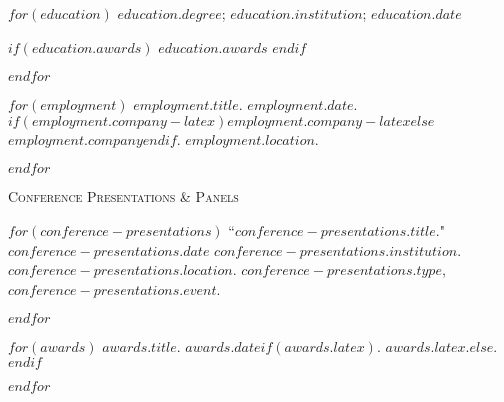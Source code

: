 \documentclass[11pt,article,oneside]{memoir}
\begin{document}
\medskip

\reversemarginpar

\bigskip

%
%

\medskip
{}

$for(education)$
\ind $education.degree$; $education.institution$; $education.date$

$if(education.awards)$
\ind \hspace{0.35in} \footnotesize $education.awards$ \normalsize \vspace{0.05in}
$endif$

$endfor$

\bigskip

\medskip
{}

$for(employment)$
\ind $employment.title$. \emph{$employment.date$}. $if(employment.company-latex)$$employment.company-latex$$else$$employment.company$$endif$. $employment.location$.

\smallskip
$endfor$

\medskip

\medskip
{}

\ind \textsc{Conference Presentations \& Panels}

\medskip

$for(conference-presentations)$
\ind ``$conference-presentations.title$." \emph{$conference-presentations.date$} $conference-presentations.institution$. $conference-presentations.location$. $conference-presentations.type$, \emph{$conference-presentations.event$}. \normalsize

\smallskip

\pagebreak[1]
$endfor$

\medskip

\medskip
{}

$for(awards)$
\ind $awards.title$. \emph{$awards.date$}$if(awards.latex)$. $awards.latex$.$else${.}$endif$
\smallskip

\pagebreak[1]
$endfor$
\end{document}
